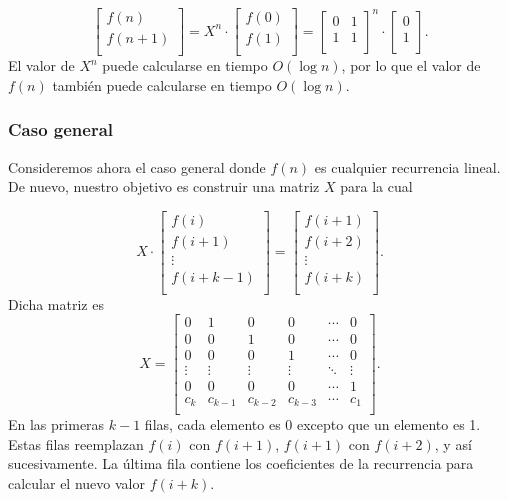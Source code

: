 \[
 \begin{bmatrix}
  f(n) \\
  f(n+1) \\
 \end{bmatrix}
=
X^n \cdot
 \begin{bmatrix}
  f(0) \\
  f(1) \\
 \end{bmatrix}
=
 \begin{bmatrix}
  0 & 1 \\
  1 & 1 \\
 \end{bmatrix}^n
\cdot
 \begin{bmatrix}
  0 \\
  1 \\
 \end{bmatrix}.
\]
El valor de $X^n$ puede calcularse en
tiempo $O(\log n)$,
por lo que el valor de $f(n)$ también puede calcularse
en tiempo $O(\log n)$.

\subsubsection{Caso general}

Consideremos ahora el caso general donde
$f(n)$ es cualquier recurrencia lineal.
De nuevo, nuestro objetivo es construir una matriz $X$
para la cual

\[ X \cdot
 \begin{bmatrix}
  f(i) \\
  f(i+1) \\
  \vdots \\
  f(i+k-1) \\
 \end{bmatrix}
=
 \begin{bmatrix}
  f(i+1) \\
  f(i+2) \\
  \vdots \\
  f(i+k) \\
 \end{bmatrix}.
\]
Dicha matriz es
\[
X =
 \begin{bmatrix}
  0 & 1 & 0 & 0 & \cdots & 0 \\
  0 & 0 & 1 & 0 & \cdots & 0 \\
  0 & 0 & 0 & 1 & \cdots & 0 \\
  \vdots & \vdots & \vdots & \vdots & \ddots & \vdots \\
  0 & 0 & 0 & 0 & \cdots & 1 \\
  c_k & c_{k-1} & c_{k-2} & c_{k-3} & \cdots & c_1 \\
 \end{bmatrix}.
\]
En las primeras $k-1$ filas, cada elemento es 0
excepto que un elemento es 1.
Estas filas reemplazan $f(i)$ con $f(i+1)$,
$f(i+1)$ con $f(i+2)$, y así sucesivamente.
La última fila contiene los coeficientes de la recurrencia
para calcular el nuevo valor $f(i+k)$.

